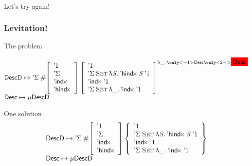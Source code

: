 \documentclass{beamer}
\begin{document}
\begin{frame}
\begin{block}{Let's try again!}
\end{block}

\end{frame}

\begin{frame}

\frametitle{Levitation!}

\begin{block}{The problem}

\[\stk{
\DescD \mapsto 
            \DSigma{\EnumT{\sqr{\begin{array}{l}
                                     \DUnit\\
                                     \SYMBDSigma\\
                                     \SYMBDIndx \\
                                     \SYMBDHindx
                                \end{array}}}}
                   {\gsqr{\begin{array}{l}
                            \DUnit\\
                            \DSigma{\Set}{\LAM{\V{S}}{\DHindx{\V{S}}{\DUnit}}}\\
                            \DIndx{\DUnit}\\
                            \DSigma{\Set}{\LAM{\_} \DIndx{\DUnit}}
                          \end{array}}{\LAM{\_} \only<-1>{\Desc}\only<2->{\redBG{\Desc}}}} \\
\Desc \mapsto \Mu{\DescD}
}\]

\end{block}

\begin{block}{One solution}
\[\stk{
\DescD \mapsto 
            \DSigma{\EnumT{\sqr{\begin{array}{l}
                                     \DUnit\\
                                     \SYMBDSigma\\
                                     \SYMBDIndx \\
                                     \SYMBDHindx
                                \end{array}}}}
                   {\gcurly{\begin{array}{l}
                            \DUnit\\
                            \DSigma{\Set}{\LAM{\V{S}}{\DHindx{\V{S}}{\DUnit}}}\\
                            \DIndx{\DUnit}\\
                            \DSigma{\Set}{\LAM{\_} \DIndx{\DUnit}}
                          \end{array}}} \\
\Desc \mapsto \Mu{\DescD}
}\]
\end{block}

\end{frame}
\end{document}
